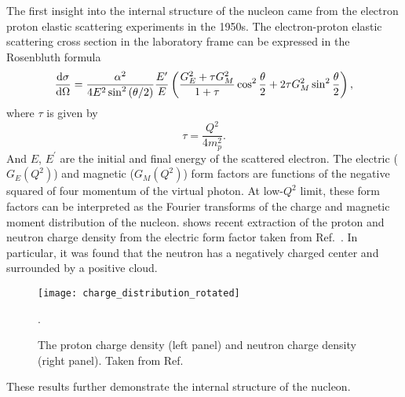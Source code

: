 \documentclass[../main.tex]{subfiles}
\begin{document}
The first insight into the internal structure of the nucleon came from the 
electron proton elastic scattering experiments \cite{hofstadter1956} in the
1950s. The electron-proton elastic scattering cross section in the laboratory
frame can be expressed in the Rosenbluth formula \cite{rosenbluth1950}
\begin{equation}
	\dv{\sigma}{\Omega} = \frac{\alpha^2}{4E^2 \sin^2\left(\theta/2\right)}
	\frac{E^\prime}{E} \left( \frac{G_E^2+\tau G_M^2}{1+\tau} \cos^2
	\frac{\theta}{2} + 2\tau G_M^2 \sin^2 \frac{\theta}{2}\right)
	\label{eq:ep_cs},
\end{equation}
where $\tau$ is given by
\begin{equation}
	\tau = \frac{Q^2}{4m_p^2}.
\end{equation}
And $E$, $E^\prime$ are the initial and final energy of the scattered electron.
The electric ($G_E\left(Q^2\right)$) and magnetic ($G_M\left(Q^2\right)$) form
factors are functions of the negative squared of four momentum of the virtual photon. At
low-$Q^2$ limit, these form factors can be interpreted as the Fourier transforms
of the charge and magnetic moment distribution of the nucleon. 
shows recent extraction of the proton and neutron charge density from the electric
form factor taken from Ref.~\cite{miller2007}. In particular, it was found that
the neutron has a negatively charged center and surrounded by a positive cloud.
\begin{figure}[htbp!]
	\centering
	\texttt{[image: charge\_distribution\_rotated]}
	\caption{The proton charge density (left panel) and neutron charge density
		(right panel). Taken from Ref.~\cite{miller2007}}.
	\label{fig:charge}
\end{figure}
These results further demonstrate the internal structure of the nucleon.
\end{document}

